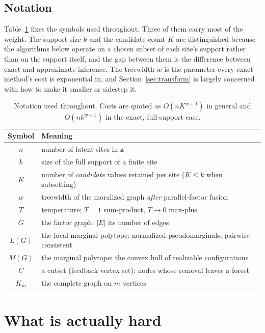 \subsection{Notation}
\label{sec:notation}

Table~\ref{tab:notation} fixes the symbols used throughout. Three of them carry most of the weight. The support size $k$ and the candidate count $K$ are distinguished because the algorithms below operate on a chosen subset of each site's support rather than on the support itself, and the gap between them is the difference between exact and approximate inference. The treewidth $w$ is the parameter every exact method's cost is exponential in, and Section~\ref{sec:transform} is largely concerned with how to make it smaller or sidestep it.

\begin{table}[h]
    \centering
    \begin{tabular}{cl}
        \toprule
        \textbf{Symbol} & \textbf{Meaning} \\
        \midrule
        $n$ & number of latent sites in $\mathbf{z}$ \\
        $k$ & size of the full support of a finite site \\
        $K$ & number of \emph{candidate} values retained per site ($K \leq k$ when subsetting) \\
        $w$ & treewidth of the moralized graph \emph{after} parallel-factor fusion \\
        $T$ & temperature; $T = 1$ sum-product, $T \rightarrow 0$ max-plus \\
        $G$ & the factor graph; $\lvert E \rvert$ its number of edges \\
        $L(G)$ & the local marginal polytope: normalized pseudomarginals, pairwise consistent \\
        $M(G)$ & the marginal polytope: the convex hull of realizable configurations \\
        $C$ & a cutset (feedback vertex set): nodes whose removal leaves a forest \\
        $K_m$ & the complete graph on $m$ vertices \\
        \bottomrule
    \end{tabular}
    \caption{Notation used throughout. Costs are quoted as $O(n K^{w+1})$ in general and $O(n k^{w+1})$ in the exact, full-support case.}
    \label{tab:notation}
\end{table}

\section{What is actually hard}
\label{sec:hardness}

